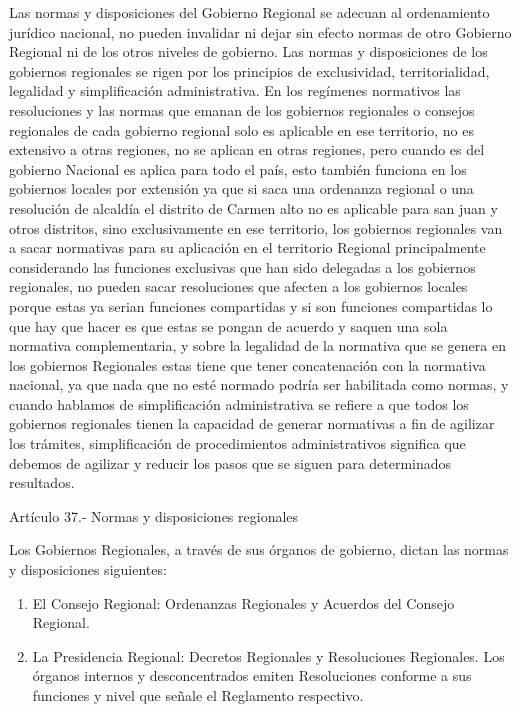 \documentclass[
  jou,
  floatsintext,
  longtable,
  a4paper,
  nolmodern,
  notxfonts,
  notimes,
  12pt,
  colorlinks=true,linkcolor=blue,citecolor=blue,urlcolor=blue]{apa7}
\providecommand{\tightlist}{%
  \setlength{\itemsep}{0pt}\setlength{\parskip}{0pt}}
\begin{document}
Las normas y disposiciones del Gobierno Regional se adecuan al
ordenamiento jurídico nacional, no pueden invalidar ni dejar sin efecto
normas de otro Gobierno Regional ni de los otros niveles de gobierno.
Las normas y disposiciones de los gobiernos regionales se rigen por los
principios de exclusividad, territorialidad, legalidad y simplificación
administrativa. En los regímenes normativos las resoluciones y las
normas que emanan de los gobiernos regionales o consejos regionales de
cada gobierno regional solo es aplicable en ese territorio, no es
extensivo a otras regiones, no se aplican en otras regiones, pero cuando
es del gobierno Nacional es aplica para todo el país, esto también
funciona en los gobiernos locales por extensión ya que si saca una
ordenanza regional o una resolución de alcaldía el distrito de Carmen
alto no es aplicable para san juan y otros distritos, sino
exclusivamente en ese territorio, los gobiernos regionales van a sacar
normativas para su aplicación en el territorio Regional principalmente
considerando las funciones exclusivas que han sido delegadas a los
gobiernos regionales, no pueden sacar resoluciones que afecten a los
gobiernos locales porque estas ya serian funciones compartidas y si son
funciones compartidas lo que hay que hacer es que estas se pongan de
acuerdo y saquen una sola normativa complementaria, y sobre la legalidad
de la normativa que se genera en los gobiernos Regionales estas tiene
que tener concatenación con la normativa nacional, ya que nada que no
esté normado podría ser habilitada como normas, y cuando hablamos de
simplificación administrativa se refiere a que todos los gobiernos
regionales tienen la capacidad de generar normativas a fin de agilizar
los trámites, simplificación de procedimientos administrativos significa
que debemos de agilizar y reducir los pasos que se siguen para
determinados resultados.

Artículo 37.- Normas y disposiciones regionales

Los Gobiernos Regionales, a través de sus órganos de gobierno, dictan
las normas y disposiciones siguientes:

\begin{enumerate}
\def\labelenumi{\alph{enumi})}
\tightlist
\item
  El Consejo Regional: Ordenanzas Regionales y Acuerdos del Consejo
  Regional.
\item
  La Presidencia Regional: Decretos Regionales y Resoluciones
  Regionales. Los órganos internos y desconcentrados emiten Resoluciones
  conforme a sus funciones y nivel que señale el Reglamento respectivo.
\end{enumerate}
\end{document}
